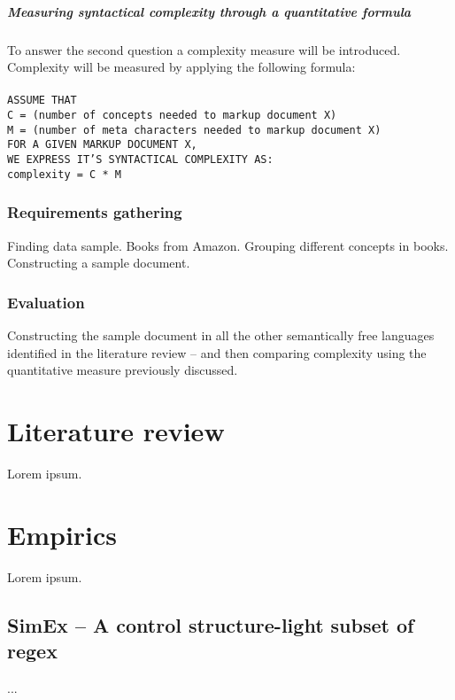 \documentclass{scrreprt}
\newcommand{\tab}{\hspace*{6pt}}
\newcommand{\tabb}{\tab\tab}
\begin{document}
\paragraph{Measuring syntactical complexity through a quantitative formula}
To answer the second question a complexity measure will be introduced. Complexity will be measured by applying the following formula:\\\\
\texttt{ASSUME THAT}\\
\texttt{\tabb C = (number of concepts needed to markup document X) }\\
\texttt{\tabb M = (number of meta characters needed to markup document X) }\\
\texttt{FOR A GIVEN MARKUP DOCUMENT X, }\\
\texttt{WE EXPRESS IT'S SYNTACTICAL COMPLEXITY AS: }\\
\texttt{\tabb complexity = C * M }


\subsection{Requirements gathering}
Finding data sample. Books from Amazon.
Grouping different concepts in books.
Constructing a sample document.

\subsection{Evaluation}
Constructing the sample document in all the other semantically free languages identified in the literature review -- and then comparing complexity using the quantitative measure previously discussed.






\chapter{Literature review}
Lorem ipsum.






\chapter{Empirics}
Lorem ipsum.


\section{SimEx -- A control structure-light subset of regex}
...
\end{document}
